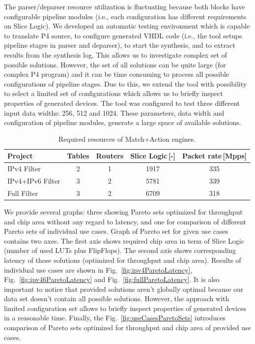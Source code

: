 The parser/deparser resource utilization is fluctuating because both blocks have 
configurable pipeline modules (i.e., each configuration has different requirements on Slice Logic). 
We developed an automatic testing environment which is capable to translate P4 source, to configure generated VHDL code 
(i.e., the tool setups pipeline stages in parser and deparser), to start the synthesis, and to extract results from the synthesis log. 
This allows us to investigate complex set of possible solutions. 
However, the set of all solutions can be quite large (for complex P4 program) and it can be time consuming to process all 
possible configurations of pipeline stages. 
Due to this, we extend the tool with possibility to select a limited set of configurations which allows us to 
briefly inspect properties of generated devices. The tool was configured to test three different input data widths: 256, 512 and 1024. 
These parameters, data width and configuration of pipeline modules, generate a large space of available solutions.

\begin{table}[t]
    \centering
    \begin{tabular}{|l||c|c||c|c|}
        \hline
        \T \textbf{Project} & \textbf{Tables} & \textbf{Routers} & \textbf{Slice Logic\,[-]} & \textbf{Packet rate\,[Mpps]} \\ \hline\hline
        \T IPv4 Filter      &        2        &        1         &           1917            &             335              \\
        IPv4+IPv6 Filter    &        3        &        2         &           5781            &             339              \\
        Full Filter         &        3        &        2         &           6709            &             318              \\ \hline
    \end{tabular}
    \caption{Required resources of Match+Action engines.}
    \label{tab:resourcesMatchActionEngines}
\end{table}

We provide several graphs: three showing Pareto sets optimized for throughput and chip area without any regard to latency, 
and one for comparison of different Pareto sets of individual use cases. 
Graph of Pareto set for given use cases contains two axes.
The first axis shows required chip area in term of Slice Logic (number of used LUTs plus FlipFlops). 
The second axis shows corresponding latency of those solutions (optimized for throughput and chip area). 
Results of individual use cases are shown in Fig.~\ref{fig:ipv4ParetoLatency}, Fig.~\ref{fig:ipv46ParetoLatency} and 
Fig.~\ref{fig:fullParetoLatency}. It is also important to notice that provided solutions aren't globally optimal because 
our data set doesn't contain all possible solutions. However, the approach with limited configuration set allows to briefly inspect
properties of generated devices in a reasonable time.
Finally, the Fig.~\ref{fig:useCasesParetoSets} introduces comparison of Pareto sets optimized for throughput and chip area 
of provided use cases.

